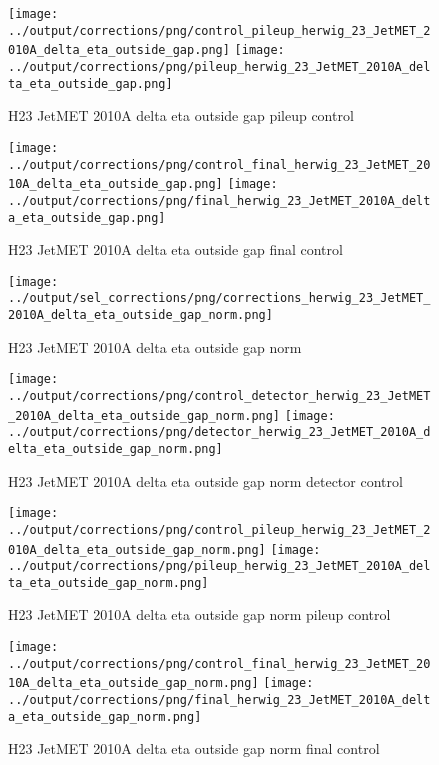 \documentclass[11pt]{book}
\begin{document}
\begin{figure}[ht]
\centering
\texttt{[image: ../output/corrections/png/control\_pileup\_herwig\_23\_JetMET\_2010A\_delta\_eta\_outside\_gap.png]}
\texttt{[image: ../output/corrections/png/pileup\_herwig\_23\_JetMET\_2010A\_delta\_eta\_outside\_gap.png]}
\caption{H23 JetMET 2010A delta eta outside gap pileup control}
\label{fig:H23_JetMET_2010A_delta_eta_outside_gap_pileup_control}
\end{figure}


\begin{figure}[ht]
\centering
\texttt{[image: ../output/corrections/png/control\_final\_herwig\_23\_JetMET\_2010A\_delta\_eta\_outside\_gap.png]}
\texttt{[image: ../output/corrections/png/final\_herwig\_23\_JetMET\_2010A\_delta\_eta\_outside\_gap.png]}
\caption{H23 JetMET 2010A delta eta outside gap final control}
\label{fig:H23_JetMET_2010A_delta_eta_outside_gap_final_control}
\end{figure}



\begin{figure}[ht]
\centering
\texttt{[image: ../output/sel\_corrections/png/corrections\_herwig\_23\_JetMET\_2010A\_delta\_eta\_outside\_gap\_norm.png]}
\caption{H23 JetMET 2010A delta eta outside gap norm}
\label{fig:H23_JetMET_2010A_delta_eta_outside_gap_norm}
\end{figure}

\begin{figure}[ht]
\centering
\texttt{[image: ../output/corrections/png/control\_detector\_herwig\_23\_JetMET\_2010A\_delta\_eta\_outside\_gap\_norm.png]}
\texttt{[image: ../output/corrections/png/detector\_herwig\_23\_JetMET\_2010A\_delta\_eta\_outside\_gap\_norm.png]}
\caption{H23 JetMET 2010A delta eta outside gap norm detector control}
\label{fig:H23_JetMET_2010A_delta_eta_outside_gap_norm_detector_control}
\end{figure}

\begin{figure}[ht]
\centering
\texttt{[image: ../output/corrections/png/control\_pileup\_herwig\_23\_JetMET\_2010A\_delta\_eta\_outside\_gap\_norm.png]}
\texttt{[image: ../output/corrections/png/pileup\_herwig\_23\_JetMET\_2010A\_delta\_eta\_outside\_gap\_norm.png]}
\caption{H23 JetMET 2010A delta eta outside gap norm pileup control}
\label{fig:H23_JetMET_2010A_delta_eta_outside_gap_norm_pileup_control}
\end{figure}


\begin{figure}[ht]
\centering
\texttt{[image: ../output/corrections/png/control\_final\_herwig\_23\_JetMET\_2010A\_delta\_eta\_outside\_gap\_norm.png]}
\texttt{[image: ../output/corrections/png/final\_herwig\_23\_JetMET\_2010A\_delta\_eta\_outside\_gap\_norm.png]}
\caption{H23 JetMET 2010A delta eta outside gap norm final control}
\label{fig:H23_JetMET_2010A_delta_eta_outside_gap_norm_final_control}
\end{figure}


 
\end{document}

